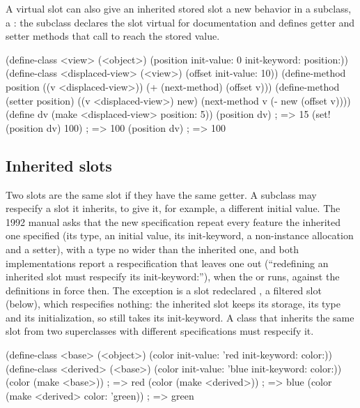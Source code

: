 \noindent A virtual slot can also give an inherited stored slot a new
behavior in a subclass, a : the subclass declares the
slot virtual for documentation and defines getter and setter methods that
call  to reach the stored value.

\begin{dylan}
(define-class <view> (<object>)
  (position init-value: 0 init-keyword: position:))
(define-class <displaced-view> (<view>)
  (offset init-value: 10))
(define-method position ((v <displaced-view>))
  (+ (next-method) (offset v)))
(define-method (setter position) ((v <displaced-view>) new)
  (next-method v (- new (offset v))))
(define dv (make <displaced-view> position: 5))
(position dv)                  ; => 15
(set! (position dv) 100)       ; => 100
(position dv)                  ; => 100
\end{dylan}

\subsection{Inherited slots}\label{sec:classes-inherited-slots}

Two slots are the same slot if they have the same getter. A subclass may
respecify a slot it inherits, to give it, for example, a different initial
value. The 1992 manual asks that the new specification repeat every feature
the inherited one specified (its type, an initial value, its init-keyword,
a non-instance allocation and a setter), with a type no wider than the
inherited one, and both implementations report a respecification that
leaves one out (``redefining an inherited slot must respecify its
init-keyword:''), when the  or 
runs, against the definitions in force then. The exception is a slot
redeclared , a filtered slot (below), which respecifies
nothing: the inherited slot keeps
its storage, its type and its initialization, so  still takes
its init-keyword. A class that inherits the same slot from two
superclasses with different specifications must respecify it.

\begin{dylan}
(define-class <base> (<object>)
  (color init-value: 'red init-keyword: color:))
(define-class <derived> (<base>)
  (color init-value: 'blue init-keyword: color:))
(color (make <base>))                 ; => red
(color (make <derived>))              ; => blue
(color (make <derived> color: 'green)) ; => green
\end{dylan}

